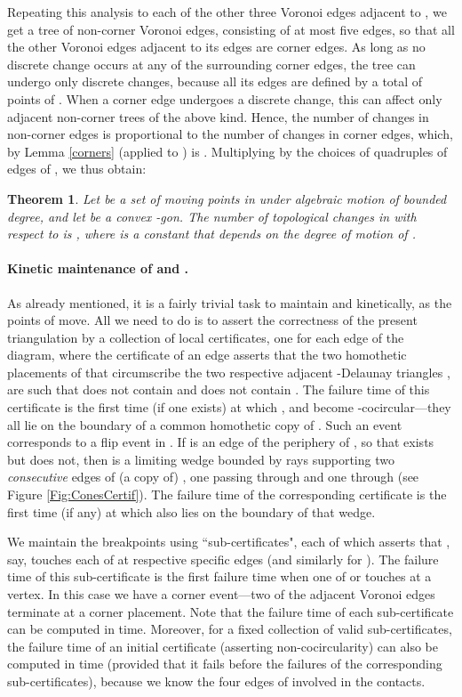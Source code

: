 \documentclass[letter,11pt]{article}
\newtheorem{theorem}{Theorem}[section]
\begin{document}
Repeating this analysis to each of the other three Voronoi edges
adjacent to , we get a tree of non-corner Voronoi edges,
consisting of at most five edges, so that all the other Voronoi edges
adjacent to its edges are corner edges. As long as no discrete change occurs at any of the surrounding corner edges, the tree can undergo only  discrete changes, because all its edges are defined by a total of  points of . When a corner edge undergoes a discrete change, this can affect only  adjacent non-corner trees of the above kind. Hence, the number of changes in non-corner edges is proportional to the number
of changes in corner edges, which, by Lemma \ref{corners} (applied to ) is . Multiplying by the  choices of quadruples of edges of , we thus obtain:

\begin{theorem} \label{Thm:PolygonalVoronoi}
Let  be a set of  moving points in  under algebraic
motion of bounded degree, and let  be a convex -gon.
The number of topological changes in  with respect to 
 is , where  is a
constant that depends on the degree of motion of .
\end{theorem}

\paragraph{Kinetic maintenance of  and 
.}
As already mentioned, it is a fairly trivial task to maintain 
 and  kinetically, as the points of  
move. All we need to do is to assert the correctness of the present 
triangulation by a collection of local certificates, one for each edge 
of the diagram, where the certificate of an edge asserts that the two 
homothetic placements  of  that circumscribe the two 
respective adjacent -Delaunay triangles 
, are such that  does not 
contain  and  does not contain . The failure time of this certificate is the first time (if one exists) at which , and  become -cocircular---they all lie on the boundary of a common homothetic copy of . Such an event corresponds to a flip event in . If  is an edge of the periphery of , so that  exists but  does not, then  is a limiting wedge bounded by rays supporting two {\it consecutive} edges of (a copy of) , one passing through  and one through  (see Figure \ref{Fig:ConesCertif}).
The failure time of the corresponding certificate is the first time (if any) at which  also lies on the boundary of that wedge.


We maintain the breakpoints using ``sub-certificates", each of which asserts that , say, touches each of  at respective specific edges (and similarly for ). The failure time of this sub-certificate is the first failure time when one of  or  touches  at a vertex. In this case we have a corner event---two of the adjacent Voronoi edges terminate at a corner placement. Note that the failure time of each sub-certificate can be computed in  time. Moreover, for a fixed collection of valid sub-certificates, the failure time of an initial certificate (asserting non-cocircularity) can also be computed in  time (provided that it fails before the failures of the corresponding sub-certificates), because we know the four edges of  involved in the contacts.
\end{document}
